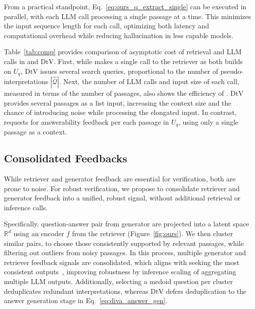 From a practical standpoint, Eq.~\ref{eq:ours_q_extract_single} can be executed in parallel, with each LLM call processing a single passage at a time.
This minimizes the input sequence length for each call, optimizing both latency and computational overhead while reducing hallucination in less capable models.










Table~\ref{tab:comp} provides comparison of asymptotic cost of retrieval and LLM calls in \ours and DtV.
First, while \ours
makes a single call to the retriever as both builds on $U_q$, DtV issues several search queries, proportional to the number of pseudo-interpretations $|\hat{\mathcal{Q}}|$.
Next, the number of LLM calls and input size of each call, measured in terms of the number of passages, also shows the efficiency of \ours.
DtV provides several passages as a list input, increasing the context size and the chance of introducing noise while processing the elongated input.
In contrast, 
\ours requests for answerability feedback per  each passage in $U_q$, 
using only a single passage as a  context.

















\subsection{Consolidated Feedbacks}
\label{subsec:clustering}


While retriever and generator feedback are essential for verification, both are prone to noise. %
For robust verification,
we propose to consolidate retriever and generator feedback into a unified, robust signal, without additional retrieval or inference calls. %






Specifically, question-answer pair from generator  are projected into a latent space $\mathbb{R}^d$ using an encoder $f$ from the retriever (Figure~\ref{fig:ours}).
We then cluster similar pairs,
to choose those consistently supported by relevant passages, while filtering out outliers from noisy passages.
In this process,
multiple generator and retriever feedback signals are consolidated, which aligns with seeking the most consistent outputs~\citep{chen-etal-2023-codet-iclr}, improving robustness by inference scaling of aggregating multiple LLM outputs.
Additionally, selecting a medoid question per cluster deduplicates redundant interpretations, whereas DtV defers deduplication to the answer generation stage in Eq.~\ref{eq:diva_answer_gen}.

